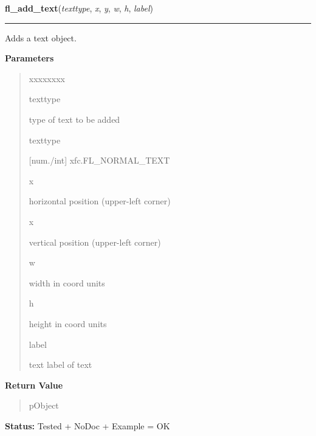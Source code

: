 \hspace{.8\funcindent}\begin{boxedminipage}{\funcwidth}

    \raggedright \textbf{fl\_add\_text}(\textit{texttype}, \textit{x}, \textit{y}, \textit{w}, \textit{h}, \textit{label})

    \vspace{-1.5ex}

    \rule{\textwidth}{0.5\fboxrule}
\setlength{\parskip}{2ex}
    Adds a text object.

\setlength{\parskip}{1ex}
      \textbf{Parameters}
      \vspace{-1ex}

      \begin{quote}
        \begin{Ventry}{xxxxxxxx}

          \item[texttype]

          type of text to be added

          \item[texttype]

          [num./int] xfc.FL\_NORMAL\_TEXT

          \item[x]

          horizontal position (upper-left corner)

          \item[x]

          vertical position (upper-left corner)

          \item[w]

          width in coord units

          \item[h]

          height in coord units

          \item[label]

          text label of text

        \end{Ventry}

      \end{quote}

      \textbf{Return Value}
    \vspace{-1ex}

      \begin{quote}
      pObject

      \end{quote}

\textbf{Status:} Tested + NoDoc + Example = OK



    \end{boxedminipage}

